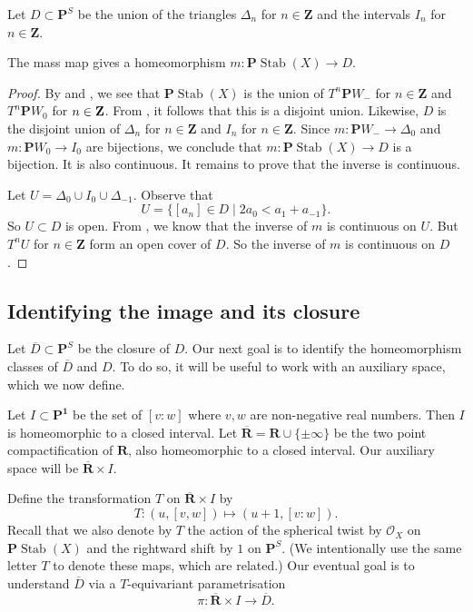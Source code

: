 \documentclass{amsart}
\begin{document}
Let \(D \subset \mathbf{P}^S\) be the union of the triangles \(\Delta_n\) for \(n \in \mathbf{Z}\) and the intervals \(I_n\) for \(n \in \mathbf{Z}\).
\begin{theorem}\label{thm:homeo}
  The mass map gives a homeomorphism \(m \colon \mathbf{P} \operatorname{Stab}(X) \to D\).
\end{theorem}
\begin{proof}
  By  and , we see that \(\mathbf{P}\operatorname{Stab}(X)\) is the union of \(T^n \mathbf{P}W_-\) for \(n \in \mathbf{Z}\) and \(T^n \mathbf{P} W_0\) for \(n \in {\bf Z}\).
  From , it follows that this is a disjoint union.
  Likewise, \(D\) is the disjoint union of \(\Delta_n\) for \(n \in \mathbf{Z}\) and \(I_n\) for \(n \in \mathbf{Z}\).
  Since \(m \colon \mathbf{P}W_- \to \Delta_0\) and \(m \colon \mathbf{P}W_0 \to I_0\) are bijections, we conclude that \(m \colon \mathbf{P} \operatorname{Stab}(X) \to D\) is a bijection.
  It is also continuous.
  It remains to prove that the inverse is continuous.

  Let \(U = \Delta_0 \cup I_0 \cup \Delta_{-1}\).
  Observe that
  \[ U = \{[a_n] \in D \mid 2a_0 < a_1 + a_{-1}\}.\]
  So \(U \subset D\) is open.
  From , we know that the inverse of \(m\) is continuous on \(U\).
  But \(T^n U\) for \(n \in \mathbf{Z}\) form an open cover of \(D\).
  So the inverse of \(m\) is continuous on \(D\).
\end{proof}

\subsection{Identifying the image and its closure}
Let \(\overline D \subset \mathbf{P}^S\) be the closure of \(D\).
Our next goal is to identify the homeomorphism classes of \(\overline D\) and \(D\).
To do so, it will be useful to work with an auxiliary space, which we now define.

Let \(I  \subset \mathbf{P^1}\) be the set of \([v:w]\) where \(v, w\) are non-negative real numbers.
Then \(I\) is homeomorphic to a closed interval.
Let \(\overline {\mathbf{R}} = \mathbf{R} \cup \{\pm \infty\}\) be the two point compactification of \(\mathbf{R}\), also homeomorphic to a closed interval.
Our auxiliary space will be \(\overline{\mathbf{R}} \times I\).

Define the transformation \(T\) on \(\overline{\mathbf{R}} \times I\) by
\[ T \colon (u,[v,w]) \mapsto (u+1,[v:w]).\]
Recall that we also denote by \(T\) the action of the spherical twist by \(\mathcal{O}_X\) on \(\mathbf{P} \operatorname{Stab}(X)\) and the rightward shift by \(1\) on \(\mathbf{P}^S\).
(We intentionally use the same letter \(T\) to denote these maps, which are related.)
Our eventual goal is to understand \(\overline D\) via a \(T\)-equivariant parametrisation
\[ \pi \colon \overline{\mathbf{R}} \times I \to \overline D.\]
\end{document}
